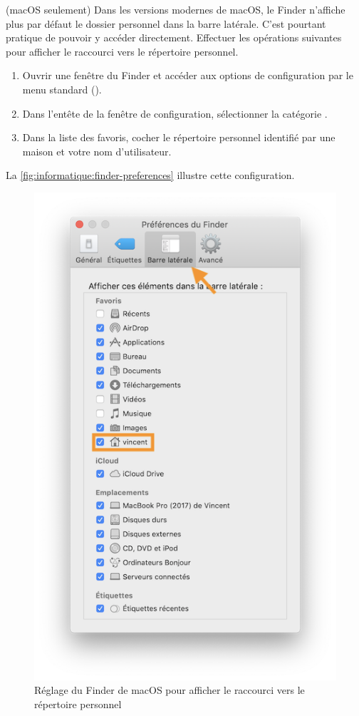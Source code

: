 \begin{exercice}[nosol]
  (macOS seulement) Dans les versions modernes de macOS,
  le Finder n'affiche plus par défaut le dossier
  personnel dans la barre latérale. C'est pourtant pratique de pouvoir
  y accéder directement. Effectuer les opérations suivantes pour
  afficher le raccourci vers le répertoire personnel.
  \begin{enumerate}[1.]
  \item Ouvrir une fenêtre du Finder et accéder aux options de
    configuration par le menu standard 
    (\code{\cmdkey\,,}).
  \item Dans l'entête de la fenêtre de configuration, sélectionner la
    catégorie .
  \item Dans la liste des favoris, cocher le répertoire personnel
    identifié par une maison et votre nom d'utilisateur.
  \end{enumerate}
  La \autoref{fig:informatique:finder-preferences} illustre cette
  configuration.

  \begin{figure}
    \centering
    \includegraphics{images/finder-preferences}
    \caption{Réglage du Finder de macOS pour afficher le raccourci
      vers le répertoire personnel}
    \label{fig:informatique:finder-preferences}
  \end{figure}
\end{exercice}


